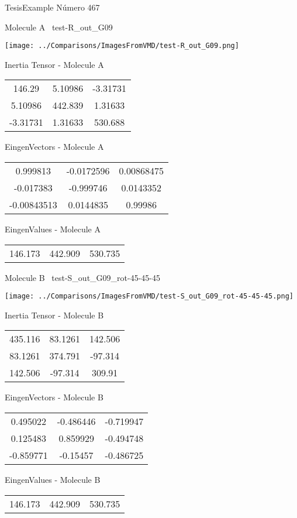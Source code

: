 \vtab[-3cm]
\begin{center}
{\large TesisExample \tab Número 467}
\end{center}
\begin{multicols}{2}
\begin{center}

Molecule A \
test-R\_out\_G09

\texttt{[image: ../Comparisons/ImagesFromVMD/test-R\_out\_G09.png]}

Inertia Tensor - Molecule A \\
\begin{tabular}{|c c c|}
146.29	 & 	5.10986	 & 	-3.31731	 \\
5.10986	 & 	442.839	 & 	1.31633	 \\
-3.31731	 & 	1.31633	 & 	530.688
\end{tabular}

\vtab
 EingenVectors - Molecule A     \\
\begin{tabular}{|c c c|}
0.999813	 & 	-0.0172596	 & 	0.00868475	 \\
-0.017383	 & 	-0.999746	 & 	0.0143352	 \\
-0.00843513	 & 	0.0144835	 & 	0.99986
\end{tabular}

\vtab
 EingenValues - Molecule A     \\
\begin{tabular}{|c c c|}
146.173	 & 	442.909	 & 	530.735	 \\
\end{tabular}
\columnbreak

Molecule B \
test-S\_out\_G09\_rot-45-45-45

\texttt{[image: ../Comparisons/ImagesFromVMD/test-S\_out\_G09\_rot-45-45-45.png]}

Inertia Tensor - Molecule B \\
\begin{tabular}{|c c c|}
435.116	 & 	83.1261	 & 	142.506	 \\
83.1261	 & 	374.791	 & 	-97.314	 \\
142.506	 & 	-97.314	 & 	309.91
\end{tabular}

\vtab
 EingenVectors - Molecule B     \\
\begin{tabular}{|c c c|}
0.495022	 & 	-0.486446	 & 	-0.719947	 \\
0.125483	 & 	0.859929	 & 	-0.494748	 \\
-0.859771	 & 	-0.15457	 & 	-0.486725
\end{tabular}

\vtab
 EingenValues - Molecule B     \\
\begin{tabular}{|c c c|}
146.173	 & 	442.909	 & 	530.735	 \\
\end{tabular}

\end{center}
\end{multicols}

